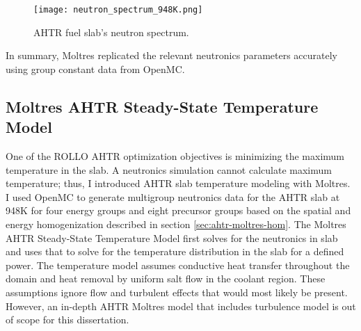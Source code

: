  \begin{figure}[H]
    \centering
    \texttt{[image: neutron\_spectrum\_948K.png]}
    \caption{AHTR fuel slab's neutron spectrum.}  
    \label{fig:neutron_spectrum_948K}
\end{figure}

In summary, Moltres replicated the relevant neutronics parameters accurately 
using group constant data from OpenMC. %

\subsection{Moltres AHTR Steady-State Temperature Model}
One of the ROLLO AHTR optimization objectives is minimizing the maximum 
temperature in the slab. 
A neutronics simulation cannot calculate maximum temperature; thus, I introduced 
AHTR slab temperature modeling with Moltres.
I used OpenMC to generate multigroup neutronics data for the AHTR slab at 948K 
for four energy groups and eight precursor groups based on the spatial and 
energy homogenization described in section \ref{sec:ahtr-moltres-hom}.
The Moltres AHTR Steady-State Temperature Model first solves for the neutronics 
in slab and uses that to solve for the temperature distribution in the slab 
for a defined power. 
The temperature model assumes conductive heat transfer throughout the domain 
and heat removal by uniform salt flow in the coolant region. 
These assumptions ignore flow and turbulent effects that would most likely be 
present. 
However, an in-depth AHTR Moltres model that includes turbulence model is 
out of scope for this dissertation. 

